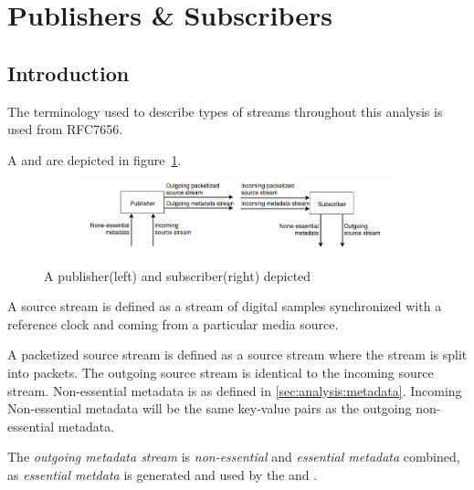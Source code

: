 \section{Publishers \& Subscribers} \label{sec:analysis:pubsub}
\subsection{Introduction}
The terminology used to describe types of streams throughout this analysis is used from RFC7656\citep{RFC:7656}.

A  and  are depicted in figure~\ref{fig:analysis:pubsub}.

\begin{figure}[h!]
    \centering
    \begin{subfigure}[b]{1\textwidth}
        \includegraphics[width=\textwidth]{figures/publisher-subscriber}
    \end{subfigure}
     \caption{A publisher(left) and subscriber(right) depicted}\label{fig:analysis:pubsub}
\end{figure}

A source stream is defined as a stream of digital samples synchronized with a reference clock and coming from a particular media source.

A packetized source stream is defined as a source stream where the stream is split into packets.
The outgoing source stream is identical to the incoming source stream.
Non-essential metadata is as defined in \ref{sec:analysis:metadata}. Incoming Non-essential metadata will be the same key-value pairs as the outgoing non-essential metadata.

The \textit{outgoing metadata stream} is \textit{non-essential} and \textit{essential metadata} combined, as \textit{essential metdata} is generated and used by the  and .


